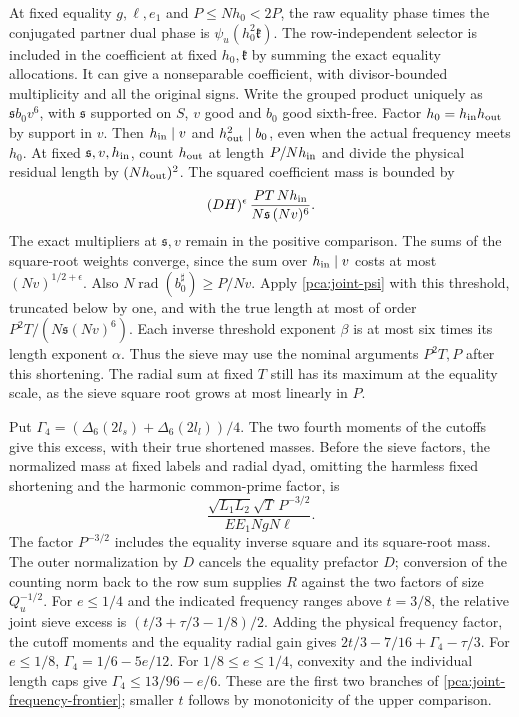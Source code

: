 At fixed equality \(g,\ell,e_1\) and \(P\le Nh_0<2P\),
the raw equality phase times the conjugated partner dual
phase is \(\psi_u(h_0^2\mathfrak k)\). The row-independent
selector is included in the coefficient at fixed
\(h_0,\mathfrak k\) by summing the exact equality allocations.
It can give a nonseparable coefficient, with divisor-bounded
multiplicity and all the original signs. Write the grouped
product uniquely as \(\mathfrak s b_0 v^6\), with
\(\mathfrak s\) supported on \(S\), \(v\) good and \(b_0\)
good sixth-free. Factor \(h_0=h_{\rm in}h_{\rm out}\)
by support in \(v\). Then \(h_{\rm in}\mid v\) and
\(h_{\rm out}^2\mid b_0\), even when the actual frequency
meets \(h_0\).
At fixed \(\mathfrak s,v,h_{\rm in}\), count \(h_{\rm out}\)
at length \(P/Nh_{\rm in}\) and divide the physical residual
length by \((Nh_{\rm out})^2\).
The squared coefficient mass is bounded by
\[
 (DH)^\epsilon\,\frac{PT\,Nh_{\rm in}}{N\mathfrak s\,(Nv)^6}.
\]
The exact multipliers at \(\mathfrak s,v\) remain in the
positive comparison. The sums of the square-root weights
converge, since the sum over \(h_{\rm in}\mid v\) costs at
most \((Nv)^{1/2+\epsilon}\).
Also \(N\operatorname{rad}(b_0^\sharp)\ge P/Nv\).
Apply \eqref{pca:joint-psi} with this threshold, truncated
below by one, and with the true length at most of order
\(P^2T/(N\mathfrak s(Nv)^6)\).
Each inverse threshold exponent \(\beta\) is at most six
times its length exponent \(\alpha\). Thus the sieve may
use the nominal arguments \(P^2T,P\) after this shortening.
The radial sum at fixed \(T\) still has its maximum at the
equality scale, as the sieve square root grows at most
linearly in \(P\).

Put \(\Gamma_4=(\Delta_6(2l_s)+\Delta_6(2l_l))/4\).
The two fourth moments of the cutoffs give this excess,
with their true shortened masses.
Before the sieve factors, the normalized mass at fixed labels
and radial dyad, omitting the harmless fixed shortening and
the harmonic common-prime factor, is
\[
 \frac{\sqrt{L_1L_2}\sqrt T\,P^{-3/2}}{E E_1 NgN\ell}.
\]
The factor \(P^{-3/2}\) includes the equality inverse square
and its square-root mass. The outer normalization by \(D\)
cancels the equality prefactor \(D\); conversion of the
counting norm back to the row sum supplies \(R\) against
the two factors of size \(Q_u^{-1/2}\).
For \(e\le1/4\) and the indicated frequency ranges above
\(t=3/8\), the relative joint sieve excess is
\((t/3+\tau/3-1/8)/2\). Adding the physical frequency factor,
the cutoff moments and the equality radial gain gives
\(2t/3-7/16+\Gamma_4-\tau/3\).
For \(e\le1/8\), \(\Gamma_4=1/6-5e/12\).
For \(1/8\le e\le1/4\), convexity and the individual length
caps give \(\Gamma_4\le13/96-e/6\).
These are the first two branches of
\eqref{pca:joint-frequency-frontier}; smaller \(t\) follows
by monotonicity of the upper comparison.

